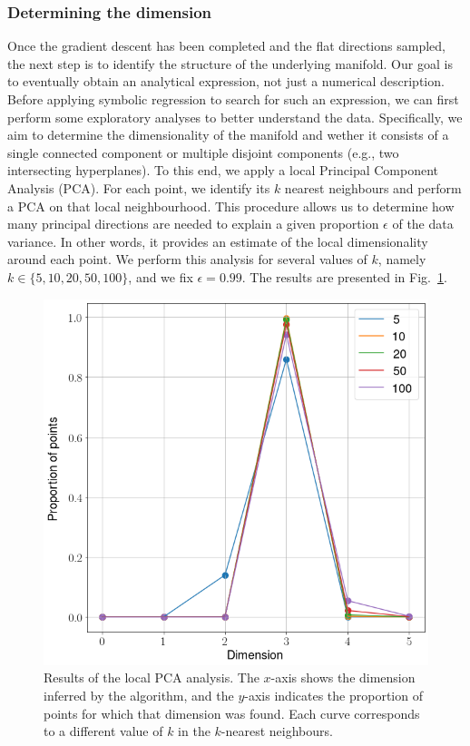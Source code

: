 \documentclass[11pt]{article}
\begin{document}
		\subsubsection{Determining the dimension}
		Once the gradient descent has been completed and the flat directions sampled, the next step is to identify the structure of the underlying manifold. Our goal is to eventually obtain an analytical expression, not just a numerical description. Before applying symbolic regression to search for such an expression, we can first perform some exploratory analyses to better understand the data. Specifically, we aim to determine the dimensionality of the manifold and wether it consists of a single connected component or multiple disjoint components (e.g., two intersecting hyperplanes).
		To this end, we apply a local Principal Component Analysis (PCA). For each point, we identify its $k$ nearest neighbours and perform a PCA on that local neighbourhood. This procedure allows us to determine how many principal directions are needed to explain a given proportion $\epsilon$ of the data variance. In other words, it provides an estimate of the local dimensionality around each point.
		We perform this analysis for several values of $k$, namely $k \in \{5, 10, 20, 50, 100\}$, and we fix $\epsilon = 0.99$. The results are presented in Fig. \ref{local_pca}.
		
		\begin{figure}[h!]
			\centering
			\includegraphics[scale=0.4]{Figures/Local_PCA.png}
			\caption{Results of the local PCA analysis. The $x$-axis shows the dimension inferred by the algorithm, and the $y$-axis indicates the proportion of points for which that dimension was found. Each curve corresponds to a different value of $k$ in the $k$-nearest neighbours.}
			\label{local_pca}
		\end{figure}
		
\end{document}
